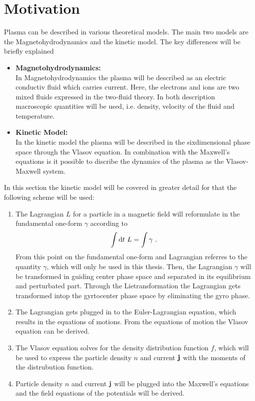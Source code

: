 
\NewPage
\chapter{Motivation}
\label{chap:motivation}

\thispagestyle{empty}
\newpage


Plasma can be described in various theoretical models. The main two models are the Magnetohydrodynamics and the kinetic model. The key differences will be briefly explained
\begin{itemize}
    \item \textbf{Magnetohydrodynamics:}\\
        In Magnetohydrodynamics the plasma will be described as an electric conductiv fluid which carries current. Here, the electrons and ions are two mixed fluids expressed in the two-fluid theory. In both description macroscopic quantities will be used, i.e. density, velocity of the fluid and temperature.
    \item \textbf{Kinetic Model:}\\
        In the kinetic model the plasma will be described in the sixdimensional phase space through the Vlasov equation. In combination with the Maxwell's equations is it possible to discribe the dynamics of the plasma as the Vlasov-Maxwell system. 
\end{itemize}
\bigskip
In this section the kinetic model will be covered in greater detail for that the following scheme will be used:
\begin{enumerate}
    \item The Lagrangian $L$ for a particle in a magnetic field will reformulate in the fundamental one-form $\gamma$ according to 
        \begin{gather}
            \int \mathrm{d}t ~ L = \int \gamma~.
        \end{gather}
        From this point on the fundamental one-form and Lagrangian referres to the quantity $\gamma$, which will only be used in this thesis. Then, the Lagrangian $\gamma$ will be transformed in guiding center phase space and separated in its equilibrium and perturbated part. Through the Lietransformation the Lagrangian gets transformed intop the gyrtocenter phase space by eliminating the gyro phase. 
    \item The Lagrangian gets plugged in to the Euler-Lagrangian equation, which results in the equations of motions. From the equations of motion the Vlasov equation can be derived.
    \item The Vlasov equation solves for the density distribution function $f$, which will be used to express the particle density $n$ and current $\boldsymbol{\mathbf{j}}$ with the moments of the distrubution function. 
    \item Particle density $n$ and current $\boldsymbol{\mathbf{j}}$ will be plugged into the Maxwell's equations and the field equations of the potentials will be derived.
\end{enumerate}
